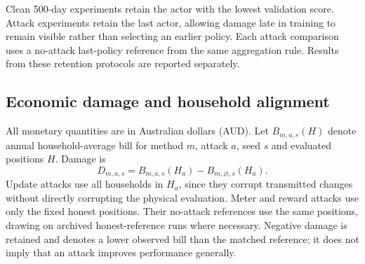 \documentclass[preprint,12pt,a4paper]{elsarticle}
\begin{document}
Clean 500-day experiments retain the actor with the lowest validation score. Attack experiments retain the last actor, allowing damage late in training to remain visible rather than selecting an earlier policy. Each attack comparison uses a no-attack last-policy reference from the same aggregation rule. Results from these retention protocols are reported separately.


\begin{table}[htbp]
\centering\small
\caption{Experimental coverage. The principal Ausgrid, ACT retraining and transfer comparisons contain six attacks and a no-attack reference per method and seed; sensitivity and clean-learning groups have separate designs.}
\label{tab:coverage}
\end{table}



\subsection{Economic damage and household alignment}
All monetary quantities are in Australian dollars (AUD). Let $B_{m,a,s}(H)$ denote annual household-average bill for method $m$, attack $a$, seed $s$ and evaluated positions $H$. Damage is
\begin{equation}
D_{m,a,s}=B_{m,a,s}(H_a)-B_{m,\varnothing,s}(H_a).
\end{equation}
Update attacks use all households in $H_a$, since they corrupt transmitted changes without directly corrupting the physical evaluation. Meter and reward attacks use only the fixed honest positions. Their no-attack references use the same positions, drawing on archived honest-reference runs where necessary. Negative damage is retained and denotes a lower observed bill than the matched reference; it does not imply that an attack improves performance generally.
\end{document}
